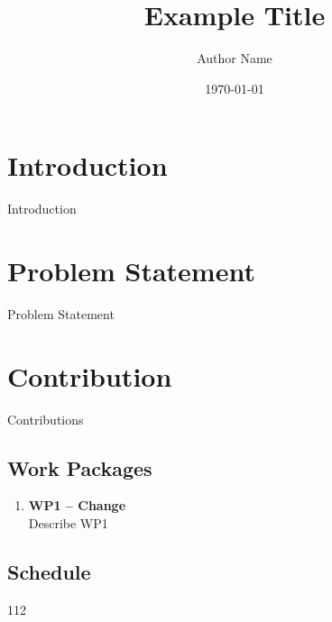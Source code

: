 \documentclass[10pt,a4paper,oneside]{article}
\title{Example Title}
\author{Author Name}
\date{\today}
\begin{document}
	\maketitle

	\section{Introduction}
	Introduction~\cite{SBK+:SPLC24}
	
	\section{Problem Statement}
	Problem Statement

	\section{Contribution}
	Contributions

	\subsection{Work Packages}
	
	\begin{enumerate}
		\item \textbf{WP1 -- Change}\\ Describe WP1
	\end{enumerate}
	\subsection{Schedule}

	\begin{center}
		\begin{ganttchart}[hgrid, vgrid,expand chart=\textwidth, milestone/.append style={fill=primary, rounded corners=3pt}]{1}{12}
			 \\
			 \\
			 \\
			 \\
			 \\
			 \\
			 \\
		\end{ganttchart}
	\end{center}
\end{document}
